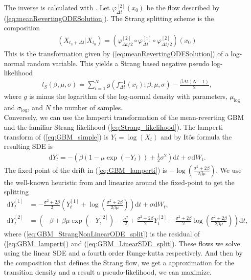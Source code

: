 The inverse is calculated with \cite[remark belown equation (9)]{SplittingSchemes}. Let $\varphi_{\Delta t}^{[2]}(x_0)$ be the flow described by (\ref{eq:meanRevertingODESolution}).
The Strang splitting scheme is the composition
\begin{align}
    \left(X_{t_0 + \Delta t} | X_{t_0}\right) = \left(\varphi_{\Delta t / 2}^{[2]}\circ \varphi_{\Delta t}^{[1]} \circ \varphi_{\Delta t / 2}^{[2]}\right)(x_0)
\end{align}
This is the transformation given by (\ref{eq:meanRevertingODESolution}) of a log-normal random variable. This yields a Strang based negative pseudo log-likelihood
\begin{align}
    l_S(\beta, \mu, \sigma) = \sum_{i = 1}^{N} g(f_{\Delta t}^{-1}(x_i); \beta,\mu, \sigma) - \frac{\beta\Delta t(N - 1)}{2},
\end{align}
where $g$ is minus the logarithm of the log-normal density with parameters, $\mu_{\mathrm{log}}$ and $\sigma_{\mathrm{log}}$, and $N$ the number of samples.\\
Conversely, we can use the lamperti transformation of the mean-reverting GBM and the familiar Strang likelihood (\ref{eq:Strang_likelihood}). The lamperti transform of (\ref{eq:GBM_simple}) is $Y_t = \log(X_t)$ and by Itôs formula the resulting SDE is
\begin{align}
    \mathrm{d}Y_t = -\left(\beta\left(1 - \mu\exp(-Y_t)\right) + \frac{1}{2}\sigma^2\right)\mathrm{d}t + \sigma \mathrm{d}W_t. \label{eq:GBM_lamperti}
\end{align}
The fixed point of the drift in (\ref{eq:GBM_lamperti}) is $-\log\left(\frac{\sigma^2 + 2\beta}{2\beta\mu}\right)$. We use the well-known heuristic from \cite{SplittingSchemes} and linearize around the fixed-point to get the splitting
\begin{align}
    \mathrm{d}Y_t^{[1]} &= - \frac{\sigma^2 + 2\beta}{2}\left(Y_t^{[1]} + \log\left(\frac{\sigma^2 + 2\beta}{2\beta \mu}\right)\right)\mathrm{d}t + \sigma \mathrm{d}W_t, \label{eq:GBM_LinearSDE_split}\\
    \mathrm{d}Y_t^{[2]} &= \left(-\beta + \beta\mu\exp(-Y_t^{[2]}) - \frac{\sigma^2}{2} + \frac{\sigma^2+2\beta}{2}Y_t^{[2]} + \frac{\sigma^2+2\beta}{2}\log\left(\frac{\sigma^2+2\beta}{2\beta\mu}\right)\right)\mathrm{d}t, \label{eq:GBM_StrangNonLinearODE_split}
\end{align}
where (\ref{eq:GBM_StrangNonLinearODE_split}) is the residual of (\ref{eq:GBM_lamperti}) and (\ref{eq:GBM_LinearSDE_split}).
These flows we solve using the linear SDE and a fourth order Runge-kutta respectively. And then by the composition that defines the Strang flow, we get a approximation for the transition density and a result a pseudo-likelihood, we can maximize.

